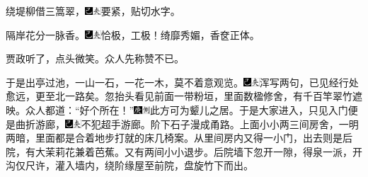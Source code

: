 绕堤柳借三篙翠，{\includegraphics[width=3mm]{../Images/00003}\includegraphics[width=3mm]{../Images/00012}\footnotesize \kaishu 要紧，贴切水字。}

隔岸花分一脉香。{\includegraphics[width=3mm]{../Images/00003}\includegraphics[width=3mm]{../Images/00012}\footnotesize \kaishu 恰极，工极！绮靡秀媚，香奁正体。}

贾政听了，点头微笑。众人先称赞不已。

于是出亭过池，一山一石，一花一木，莫不着意观览。{\includegraphics[width=3mm]{../Images/00003}\includegraphics[width=3mm]{../Images/00012}\footnotesize \kaishu 浑写两句，已见经行处愈远，更至北一路矣。}忽抬头看见前面一带粉垣，里面数楹修舍，有千百竿翠竹遮映。众人都道：“好个所在！”{\includegraphics[width=3mm]{../Images/00004}\includegraphics[width=3mm]{../Images/00011}\footnotesize \kaishu 此方可为颦儿之居。}于是大家进入，只见入门便是曲折游廊，{\includegraphics[width=3mm]{../Images/00003}\includegraphics[width=3mm]{../Images/00012}\footnotesize \kaishu 不犯超手游廊。}阶下石子漫成甬路。上面小小两三间房舍，一明两暗，里面都是合着地步打就的床几椅案。从里间房内又得一小门，出去则是后院，有大茉莉花兼着芭蕉。又有两间小小退步。后院墙下忽开一隙，得泉一派，开沟仅尺许，灌入墙内，绕阶缘屋至前院，盘旋竹下而出。

